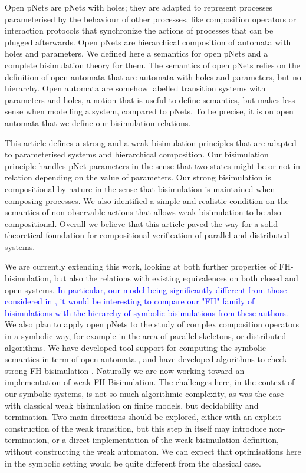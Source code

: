 \documentclass{lmcs}
\newcommand{\ERIC}[1]{\textcolor{blue}{#1}}
\begin{document}
Open pNets are pNets with holes; they are adapted to represent processes parameterised by the behaviour of other processes, like composition operators or interaction 
protocols that synchronize the actions of processes that can be plugged afterwards. Open
pNets are hierarchical composition of automata with holes and parameters. We
defined here a semantics for open pNets and a complete bisimulation theory for them. 
The semantics of open pNets relies on the definition of open automata that are automata with holes and parameters, but no hierarchy. Open automata are somehow labelled transition systems with parameters and holes, a notion that is useful to define semantics, but makes less sense when modelling a system, compared to pNets. To be precise, it is on open automata that we define our bisimulation relations.

This article defines a strong and a weak bisimulation principles that are adapted to parameterised systems and hierarchical composition. Our bisimulation principle handles pNet parameters in the sense that two states might be or not in relation depending on the value of parameters. Our strong  bisimulation is compositional by nature in the sense that bisimulation is maintained when composing processes. We also identified a simple and realistic condition on the semantics of non-observable actions that allows weak bisimulation to be also compositional. Overall we believe that this article paved the way for a solid theoretical foundation for compositional verification of parallel and distributed systems.


We are currently extending this work,  looking at  both further properties of FH-bisimulation, but also
the relations with existing equivalences on both closed and open systems. \ERIC{In particular, our model being significantly different from those considered in \cite{IngolfsdottirL:2001}, it
would be interesting to compare our "FH" family of bisimulations with the hierarchy of symbolic bisimulations from these authors.}
We also plan to apply open pNets to the study of complex composition
operators in a symbolic way, for example in the area of parallel
skeletons, or distributed algorithms.
We have developed tool support for computing the
symbolic semantics in term of open-automata \cite{QBMZ-AVOCS18}, and have
developed algorithms to check strong FH-bisimulation \cite{hou:hal-02406098}.  
Naturally we are now working toward an implementation of weak FH-Bisimulation. 
The challenges here, in the context of our symbolic systems, is not so much algorithmic complexity,
as was the case with classical weak bisimulation on finite models, but decidability and termination.
Two main directions should be explored, either with an explicit construction of the weak transition, but this step in
itself may introduce non-termination, or a direct implementation of the weak bisimulation definition, without
constructing the weak automaton. We can expect that optimisations here in the symbolic setting would be quite different from the classical case.
\end{document}
